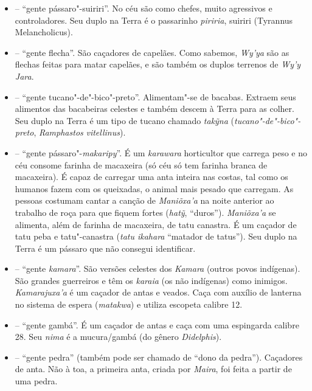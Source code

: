 \begin{itemize}
  caçador de nhambus, macacos"-pregos e mutuns. Seu duplo é o gavião
  \emph{jamukunia}, gavião"-de"-penacho (\emph{Spizaetus ornatos}).
\item
  \emph{} -- ``gente pássaro"-suiriri''. No céu são
  como chefes, muito agressivos e controladores. Seu duplo na Terra é o
  passarinho \emph{piriria}, suiriri (Tyrannus Melancholicus).
\item
  \emph{} -- ``gente flecha''. São caçadores de
  capelães. Como sabemos, \emph{Wy'ya} são as flechas feitas
  para matar capelães, e são também os duplos terrenos de
  \emph{Wy'y Jara}.
\item
  \emph{} -- ``gente tucano"-de"-bico"-preto''.
  Alimentam"-se de bacabas. Extraem seus alimentos das bacabeiras
  celestes e também descem à Terra para as colher. Seu duplo na Terra é
  um tipo de tucano chamado \emph{takỹna}
  (\emph{tucano"-de"-bico"-preto}, \emph{Ramphastos} \emph{vitellinus}).
\item
   -- ``gente pássaro"-\emph{makaripy}''. É um
  \emph{karawara} horticultor que carrega peso e no céu consome farinha
  de macaxeira (só céu só tem farinha branca de macaxeira). É capaz de
  carregar uma anta inteira nas costas, tal como os humanos fazem com os
  queixadas, o animal mais pesado que carregam. As pessoas costumam
  cantar a canção de \emph{Maniõxa'a} na noite anterior ao trabalho de
  roça para que fiquem fortes (\emph{hatỹ}, ``duros''). \emph{Maniõxa'a}
  se alimenta, além de farinha de macaxeira, de tatu canastra. É um
  caçador de tatu peba e tatu"-canastra (\emph{tatu ikahara} ``matador de
  tatus''). Seu duplo na Terra é um pássaro que não consegui
  identificar.
\item
   -- ``gente \emph{kamara}''. São versões
  celestes dos \emph{Kamara} (outros povos indígenas). São
  grandes guerreiros e têm os \emph{karaia} (os não indígenas) como
  inimigos. \emph{Kamarajuxa'a} é um caçador de antas e veados. Caça com
  auxílio de lanterna no sistema de espera (\emph{matakwa}) e utiliza
  escopeta calibre 12.
\item
  \emph{} -- ``gente gambá''. É um caçador de antas e
  caça com uma espingarda calibre 28. Seu \emph{nima} é a mucura/gambá
  (do gênero \emph{Didelphis}).
\item
  \emph{} -- ``gente pedra'' (também pode ser chamado de
  ``dono da pedra''). Caçadores de anta. Não à toa, a primeira anta,
  criada por \emph{Maira}, foi feita a partir de uma pedra.

\end{itemize}
